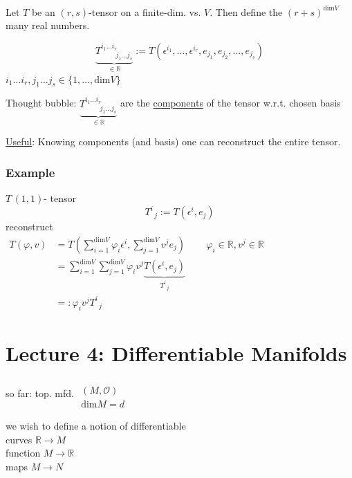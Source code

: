 \documentclass[10pt]{amsart}
\begin{document}
\begin{multicols*}{2}
Let $T$ be an $(r,s)$-tensor on a finite-dim. vs. $V$.  Then define the $(r+s)^{\text{dim}V}$ many real numbers.  

\[
\underbrace{T^{i_1 \dots i_r}_{ \qquad \, j_1 \dots j_s} }_{\in \mathbb{R}} := T(\epsilon^{i_1}, \dots , \epsilon^{i_r} , e_{j_1} , e_{j_2}, \dots, e_{j_s} )
\]
$i_1 \dots i_r, j_1 \dots j_s \in \lbrace 1 , \dots , \text{dim}V \rbrace$

Thought bubble: $\underbrace{T^{i_1 \dots i_r}_{ \qquad \, j_1 \dots j_s} }_{\in \mathbb{R}}$ are the \underline{components} of the tensor w.r.t. chosen basis

\underline{Useful}: Knowing components (and basis) one can reconstruct the entire tensor.

\subsubsection*{Example} $T \, (1,1)$- tensor
\[
T^i_{ \; \; j} := T(\epsilon^i, e_j)
\]
reconstruct \\
$\begin{aligned} 
T(\varphi,v) & =T(\sum_{i=1}^{\text{dim}{V}}\varphi_i \epsilon^i, \sum_{j=1}^{\text{dim}V} v^j e_j)   \qquad \, \varphi_i \in \mathbb{R}, v^j \in \mathbb{R} \\ 
&  = \sum_{i=1}^{\text{dim}V} \sum_{j=1}^{\text{dim}{V}} \varphi_i v^j \underbrace{ T(\epsilon^i, e_j) }_{T^i_{ \; \; j}} \\
& =: \varphi_i v^j T^i_{ \; \; j}
\end{aligned}$







\section{Lecture 4: Differentiable Manifolds}

so far: top. mfd. $\begin{gathered}  \quad \\ 
(M,\mathcal{O}) \\
\text{dim}M = d \end{gathered}$

we wish to define a notion of differentiable  \\
\phantom{ \quad \quad \, } curves $\mathbb{R} \to M$ \\
\phantom{ \quad \quad \, } function $M \to \mathbb{R}$ \\
\phantom{ \quad \quad \, } maps $M \to N$


\end{multicols*}
\end{document}
